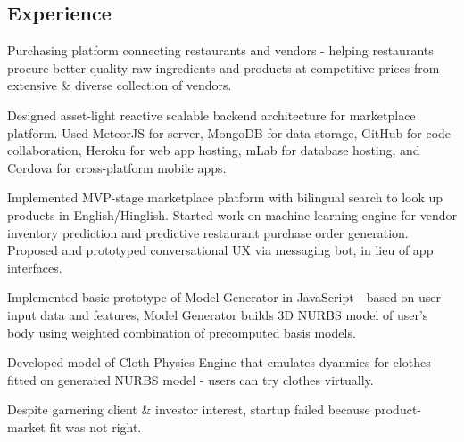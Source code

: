 \documentclass[]{deedy}
\begin{document}
\hfill
%
\begin{minipage}[t]{0.72\textwidth}
\begin{flushleft}
%
\section{Experience}
%
\begin{tightemize}
\item Purchasing platform connecting restaurants and vendors - helping restaurants procure better quality raw ingredients and products at competitive prices from extensive \& diverse collection of vendors.
\item Designed asset-light reactive scalable backend architecture for marketplace platform. Used MeteorJS for server, MongoDB for data storage, GitHub for code collaboration, Heroku for web app hosting, mLab for database hosting, and Cordova for cross-platform mobile apps.
\item Implemented MVP-stage marketplace platform with bilingual search to look up products in English/Hinglish. Started work on machine learning engine for vendor inventory prediction and predictive restaurant purchase order generation. Proposed and prototyped conversational UX via messaging bot, in lieu of app interfaces.
\end{tightemize}
\sectionsep
%
\begin{tightemize}
\item Implemented basic prototype of Model Generator in JavaScript - based on user input data and features, Model Generator builds 3D NURBS model of user's body using weighted combination of precomputed basis models.
\item Developed model of Cloth Physics Engine that emulates dyanmics for clothes fitted on generated NURBS model - users can try clothes virtually.
\item Despite garnering client \& investor interest, startup failed because product-market fit was not right.
\end{tightemize}
\sectionsep
%

\end{flushleft}
\end{minipage}
\end{document}
